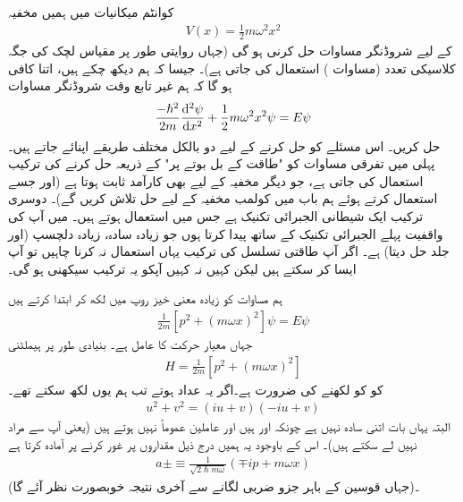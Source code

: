 کوانٹم میکانیات میں ہمیں مخفیہ
\begin{align}\label{مساوات_شروڈنگر_مخفیہ_ہارمونی}
V(x)=\frac{1}{2}m\omega ^{2}x^{2}
\end{align}
کے لیے شروڈنگر  مساوات حل کرنی ہو گی (جہاں روایتی طور پر مقیاس لچک کی جگہ کلاسیکی تعدد (مساوات ) استعمال کی جاتی ہے)۔  جیسا کہ ہم دیکھ چکے ہیں، اتنا کافی ہو گا کہ  ہم  غیر تابع وقت شروڈنگر مساوات
\begin{align}\label{مساوات_شروڈنگر_مخفی_قوہ_الف}
\frac{-\hslash ^{2}}{2m}\frac{\dif{^{2}\psi}}{\dif{x^{2}}}+\frac{1}{2}m\omega ^{2}x^{2}\psi=E\psi
\end{align}
حل کریں۔ اس مسئلے کو حل کرنے کے لیے دو بالکل مختلف طریقے اپنائے جاتے ہیں۔ پہلی میں  تفرقی مساوات کو "طاقت کے بل بوتے پر"    کے ذریعہ حل کرنے کی ترکیب استعمال کی جاتی ہے، جو دیگر مخفیہ کے لیے بھی کارآمد ثابت ہوتا ہے  (اور جسے استعمال کرتے ہوئے ہم باب  میں کولمب مخفیہ کے لیے حل تلاش کریں گے)۔ دوسری ترکیب ایک شیطانی الجبرائی تکنیک ہے جس میں  استعمال ہوتے ہیں۔ میں آپ کی واقفیت پہلے الجبرائی تکنیک کے ساتھ پیدا کرتا ہوں جو زیادہ سادہ، زیادہ دلچسپ (اور جلد حل دیتا) ہے۔ اگر آپ طاقتی تسلسل کی ترکیب یہاں استعمال نہ کرنا چاہیں تو آپ ایسا کر سکتے ہیں لیکن کہیں نہ کہیں  آپکو یہ ترکیب سیکھنی ہو گی۔

ہم مساوات  کو زیادہ معنی خیز روپ میں لکھ کر ابتدا کرتے ہیں
\begin{align}
\frac{1}{2m}[p^{2}+(m\omega x)^{2}]\psi=E\psi
\end{align}
جہاں  معیار حرکت کا عامل ہے۔ بنیادی طور پر  ہیملٹنی
\begin{align}
H=\frac{1}{2m}[p^{2}+(m\omega x)^{2}]
\end{align}
کو  کو  لکھنے کی ضرورت ہے۔اگر یہ عداد ہوتے تب ہم یوں لکھ سکتے تھے۔
\begin{align*}
u^{2}+v^{2}=(iu+v)(-iu+v)
\end{align*}
البتہ  یہاں بات اتنی سادہ نہیں ہے چونکہ  اور   ہیں اور  عاملین عموماً   نہیں ہوتے ہیں (یعنی آپ  سے مراد  نہیں لے سکتے ہیں)۔ اس کے باوجود یہ ہمیں درج ذیل مقداروں پر غور کرنے پر آمادہ  کرتا ہے
\begin{align}\label{مساوات_شروڈنگر_تعریفات_سیڑھی}
a\pm\equiv \frac{1}{\sqrt{2\hslash m\omega}}(\mp ip+m\omega x)
\end{align}
(جہاں قوسین کے باہر جزو ضربی لگانے سے آخری نتیجہ خوبصورت نظر آئے گا)۔

